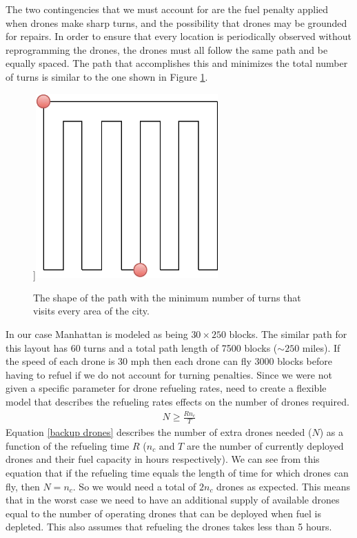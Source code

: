 \documentclass{article}
\begin{document}
\indent \indent The two contingencies that we must account for are the fuel penalty applied when drones make sharp turns, and the possibility that drones may be grounded for repairs. In order to ensure that every location is periodically observed without reprogramming the drones, the drones must all follow the same path and be equally spaced. The path that accomplishes this and minimizes the total number of turns is similar to the one shown in Figure \ref{path}.
\begin{figure}[htb!]
    \centering]{{\includegraphics[width=7cm]{figures/optimal_path.pdf} }}%
    \caption{The shape of the path with the minimum number of turns that visits every area of the city.}
    \label{path}
\end{figure}
\newline\indent In our case Manhattan is modeled as being $30\times 250$ blocks. The similar path for this layout has 60 turns and a total path length of 7500 blocks ($\sim 250$ miles). If the speed of each drone is 30 mph then each drone can fly 3000 blocks before having to refuel if we do not account for turning penalties. Since we were not given a specific parameter for drone refueling rates, need to create a flexible model that describes the refueling rates effects on the number of drones required. 
\begin{eqnarray}
N \geq \frac{R n_{c}}{T}\label{backup drones}
\end{eqnarray} 
Equation \ref{backup drones} describes the number of extra drones needed ($N$) as a function of the refueling time $R$ ($n_{c}$ and $T$ are the number of currently deployed drones and their fuel capacity in hours respectively). We can see from this equation that if the refueling time equals the length of time for which drones can fly, then $N = n_{c}$.  So we would need a total of $2n_{c}$ drones as expected. 
This means that in the worst case we need to have an additional supply of available drones equal to the number of operating drones that can be deployed when fuel is depleted. This also assumes that refueling the drones takes less than 5 hours. 
\end{document}
